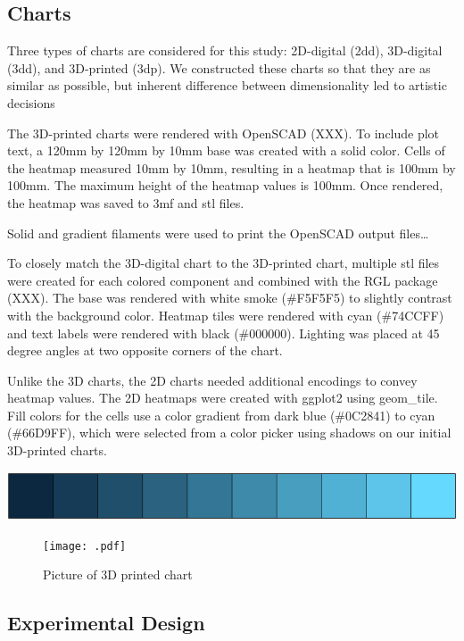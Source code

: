 \documentclass[
  letterpaper,
  DIV=11,
  numbers=noendperiod]{scrartcl}
\begin{document}
\subsection{Charts}\label{charts}

Three types of charts are considered for this study: 2D-digital (2dd),
3D-digital (3dd), and 3D-printed (3dp). We constructed these charts so
that they are as similar as possible, but inherent difference between
dimensionality led to artistic decisions

The 3D-printed charts were rendered with OpenSCAD (XXX). To include plot
text, a 120mm by 120mm by 10mm base was created with a solid color.
Cells of the heatmap measured 10mm by 10mm, resulting in a heatmap that
is 100mm by 100mm. The maximum height of the heatmap values is 100mm.
Once rendered, the heatmap was saved to 3mf and stl files.

Solid and gradient filaments were used to print the OpenSCAD output
files\ldots{}

To closely match the 3D-digital chart to the 3D-printed chart, multiple
stl files were created for each colored component and combined with the
RGL package (XXX). The base was rendered with white smoke (\#F5F5F5) to
slightly contrast with the background color. Heatmap tiles were rendered
with cyan (\#74CCFF) and text labels were rendered with black
(\#000000). Lighting was placed at 45 degree angles at two opposite
corners of the chart.

Unlike the 3D charts, the 2D charts needed additional encodings to
convey heatmap values. The 2D heatmaps were created with ggplot2 using
geom\_tile. Fill colors for the cells use a color gradient from dark
blue (\#0C2841) to cyan (\#66D9FF), which were selected from a color
picker using shadows on our initial 3D-printed charts.

\includegraphics{index_files/figure-pdf/unnamed-chunk-3-1.pdf}

\begin{figure}[H]

{\centering \texttt{[image: .pdf]}

}

\caption{Picture of 3D printed chart}

\end{figure}%

\subsection{Experimental Design}\label{experimental-design}
\end{document}
